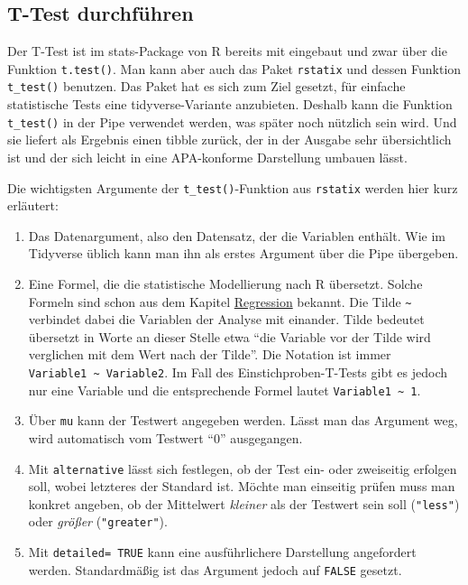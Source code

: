 \documentclass[
]{book}
\begin{document}
\hypertarget{t-test-durchfuxfchren}{%
\subsection{T-Test durchführen}\label{t-test-durchfuxfchren}}

Der T-Test ist im stats-Package von R bereits mit eingebaut und zwar über die Funktion \texttt{t.test()}. Man kann aber auch das Paket \texttt{rstatix} und dessen Funktion \texttt{t\_test()} benutzen. Das Paket hat es sich zum Ziel gesetzt, für einfache statistische Tests eine tidyverse-Variante anzubieten. Deshalb kann die Funktion \texttt{t\_test()} in der Pipe verwendet werden, was später noch nützlich sein wird. Und sie liefert als Ergebnis einen tibble zurück, der in der Ausgabe sehr übersichtlich ist und der sich leicht in eine APA-konforme Darstellung umbauen lässt.

Die wichtigsten Argumente der \texttt{t\_test()}-Funktion aus \texttt{rstatix} werden hier kurz erläutert:

\begin{enumerate}
\def\labelenumi{\arabic{enumi}.}
\item
  Das Datenargument, also den Datensatz, der die Variablen enthält. Wie im Tidyverse üblich kann man ihn als erstes Argument über die Pipe übergeben.
\item
  Eine Formel, die die statistische Modellierung nach R übersetzt. Solche Formeln sind schon aus dem Kapitel \protect\hyperlink{regression}{Regression} bekannt. Die Tilde \texttt{\textasciitilde{}} verbindet dabei die Variablen der Analyse mit einander. Tilde bedeutet übersetzt in Worte an dieser Stelle etwa ``die Variable vor der Tilde wird verglichen mit dem Wert nach der Tilde''. Die Notation ist immer \texttt{Variable1\ \textasciitilde{}\ Variable2}. Im Fall des Einstichproben-T-Tests gibt es jedoch nur eine Variable und die entsprechende Formel lautet \texttt{Variable1\ \textasciitilde{}\ 1}.
\item
  Über \texttt{mu} kann der Testwert angegeben werden. Lässt man das Argument weg, wird automatisch vom Testwert ``0'' ausgegangen.
\item
  Mit \texttt{alternative} lässt sich festlegen, ob der Test ein- oder zweiseitig erfolgen soll, wobei letzteres der Standard ist. Möchte man einseitig prüfen muss man konkret angeben, ob der Mittelwert \emph{kleiner} als der Testwert sein soll (\texttt{"less"}) oder \emph{größer} (\texttt{"greater"}).
\item
  Mit \texttt{detailed=\ TRUE} kann eine ausführlichere Darstellung angefordert werden. Standardmäßig ist das Argument jedoch auf \texttt{FALSE} gesetzt.
\end{enumerate}
\end{document}
